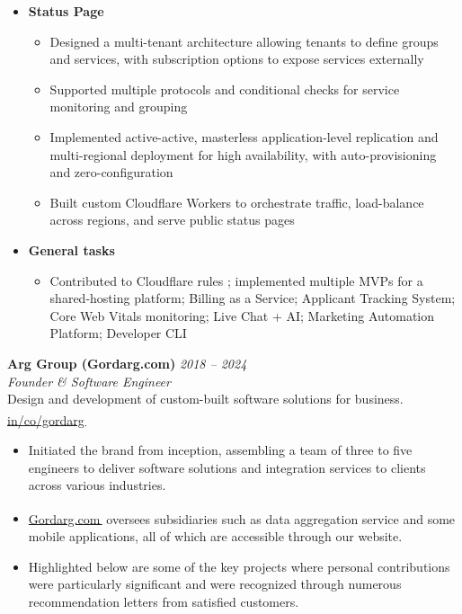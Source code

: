 \documentclass[9pt,a4paper]{article}
\let\orighref\href
\renewcommand{\href}[2]{\orighref{#1}{#2\,{\textsuperscript{\tiny{\textcolor{heritagered}{\faExternalLink}}}}}}
\newlength{\ListLeftMargin}   \setlength{\ListLeftMargin}{0.15in}
\newlength{\ListTopSep}      \setlength{\ListTopSep}{0pt}
\newlength{\ListItemSep}     \setlength{\ListItemSep}{3pt}
\newlength{\ListParsep}      \setlength{\ListParsep}{0pt}
\newlength{\ProjectTopSep}   \setlength{\ProjectTopSep}{1pt}
\newlength{\ProjectItemSep}  \setlength{\ProjectItemSep}{1pt}
\newcommand{\deemph}[1]{{\color{gray}#1}}
\newcommand{\ProjHeading}[1]{%
  \item \textbf{#1}%
}
\newenvironment{ProjectBlock}{%
  \begin{itemize}[leftmargin=\ListLeftMargin, topsep=\ProjectTopSep, itemsep=\ProjectItemSep, parsep=0pt, label={}]
}{%
  \end{itemize}
}
\newcommand{\PositionHeader}[4]{%
  \vspace{2pt}%
  \noindent\textbf{#1} \hfill \textit{\small\deemph{\textcolor{marineblue}{#4}}} \\%
  \noindent\textit{\small #3} \\%
  \noindent\small\deemph{#2}%
  \vspace{4pt}%
}
\begin{document}
\begin{ProjectBlock}
  \ProjHeading{Status Page}
    \begin{itemize}[leftmargin=*, topsep=\ProjectTopSep, itemsep=\ProjectItemSep, parsep=0pt, label=\textbullet]
      \item Designed a multi-tenant architecture allowing tenants to define groups and services, with subscription options to expose services externally
      \item Supported multiple protocols and conditional checks for service monitoring and grouping
      \item Implemented active-active, masterless application-level replication and multi-regional deployment for high availability, with auto-provisioning and zero-configuration
      \item Built custom Cloudflare Workers to orchestrate traffic, load-balance across regions, and serve public status pages
    \end{itemize}

  \ProjHeading{General tasks}
    \begin{itemize}[leftmargin=*, topsep=\ProjectTopSep, itemsep=\ProjectItemSep, parsep=0pt, label=\textbullet]
      \item Contributed to Cloudflare rules ; implemented multiple MVPs for a shared-hosting platform; Billing as a Service; Applicant Tracking System; Core Web Vitals monitoring; Live Chat + AI; Marketing Automation Platform; Developer CLI
    \end{itemize}
\end{ProjectBlock}

\PositionHeader{Arg Group (Gordarg.com)}{Design and development of custom-built software solutions for business. \href{https://www.linkedin.com/company/gordarg/}{in/co/gordarg}}{Founder \& Software Engineer}{2018 -- 2024}
\begin{itemize}[leftmargin=\ListLeftMargin, topsep=\ListTopSep, itemsep=\ListItemSep, parsep=\ListParsep]
  \item Initiated the brand from inception, assembling a team of three to five engineers to deliver software solutions and integration services to \highlight[qanary, draw=cream]{50\textsuperscript{+}} clients across various industries.
  \item \href{https://gordarg.com}{Gordarg.com} oversees subsidiaries such as data aggregation service and some mobile applications, all of which are accessible through our website.
  \item Highlighted below are some of the key projects where personal contributions were particularly significant and were recognized through numerous recommendation letters from satisfied customers.
\end{itemize}
\end{document}
